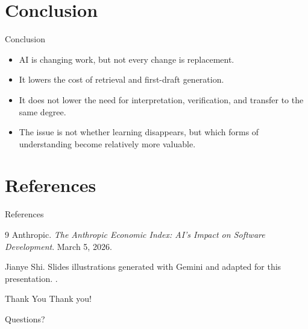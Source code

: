 \documentclass[aspectratio=169]{beamer}
\begin{document}
\section{Conclusion}

\begin{frame}{Conclusion}
  \begin{itemize}
    \item AI is changing work, but not every change is replacement.
    \item It lowers the cost of retrieval and first-draft generation.
    \item \alert{It does not lower the need for interpretation, verification, and transfer to the same degree.}
    \item The issue is not whether learning disappears, but which forms of understanding become relatively more valuable.
  \end{itemize}
\end{frame}

\section{References}

\begin{frame}[allowframebreaks]{References}
  \footnotesize
  \begin{thebibliography}{9}
    Anthropic.
    \newblock \emph{The Anthropic Economic Index: AI's Impact on Software Development}.
    \newblock March 5, 2026.

    Jianye Shi.
    \newblock Slides illustrations generated with Gemini and adapted for this presentation.
    .
  \end{thebibliography}
\end{frame}

\begin{frame}{Thank You}
  \centering
  {\LARGE Thank you!}

  \vspace{1em}
  Questions?
\end{frame}
\end{document}

